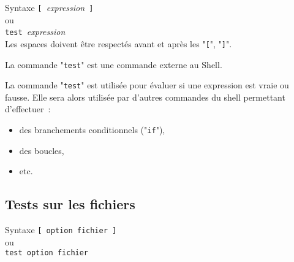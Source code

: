 \begin{definition}{Syntaxe}
\verb*=[ =\textit{expression}\verb*= ]=\\
ou\\
\verb*=test =\textit{expression}\\[1ex]
Les espaces doivent {\^e}tre respect{\'e}s avant et apr{\`e}s les "\verb=[=", "\verb=]=".
\end{definition}

\begin{remarque}
La commande "\texttt{test}" est une commande externe au Shell.
\end{remarque}

La commande "\texttt{test}" est utilis{\'e}e pour {\'e}valuer si une expression est vraie
ou fausse. Elle sera alors utilis{\'e}e par d'autres commandes du shell permettant
d'effectuer~:
\begin{itemize}
	\item	des branchements conditionnels ("\texttt{if}"),
	\item	des boucles,
	\item	etc.
\end{itemize}

\subsection{Tests sur les fichiers}

\begin{definition}{Syntaxe}
\verb*=[ option fichier ]=\\
ou \\
\verb*=test option fichier=
\end{definition}

